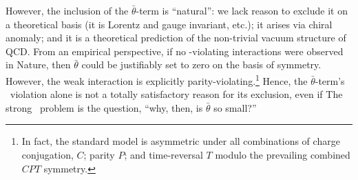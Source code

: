 However, the inclusion of the $\bar θ$-term is ``natural'': we lack reason to exclude it on a theoretical basis (it is Lorentz and gauge invariant, etc.); it arises via chiral anomaly; and it is a theoretical prediction of the non-trivial vacuum structure of QCD.
From an empirical perspective, if no \CP-violating interactions were observed in Nature, then $\bar θ$ could be justifiably set to zero on the basis of symmetry.
However, the weak interaction is explicitly parity-violating.\footnote{
	In fact, the standard model is asymmetric under all combinations of charge conjugation, $C$; parity $P$; and time-reversal $T$ modulo the prevailing combined $CPT$ symmetry.
}
Hence, the $\bar θ$-term's \CP\ violation alone is not a totally satisfactory reason for its exclusion, even if 
The strong \CP\ problem is the question, ``why, then, is $\bar θ$ so small?''
